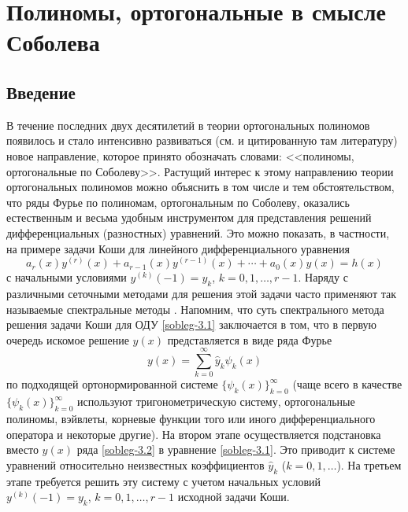 \chapter{Полиномы, ортогональные в смысле Соболева}
\section{Введение}\label{common-sob-intro}
В течение последних двух десятилетий в теории ортогональных полиномов появилось и стало
интенсивно развиваться (см. \cite{sobleg-KwonLittl1, sobleg-KwonLittl2, sobleg-MarcelAlfaroRezola, sobleg-IserKoch, sobleg-Meijer, sobleg-Lopez1995, sobleg-MarcelXu, sobleg-Shar2016} и цитированную там литературу) новое направление, которое принято обозначать словами: <<полиномы, ортогональные по Соболеву>>. Растущий интерес  к этому направлению теории ортогональных полиномов можно объяснить в том числе и тем обстоятельством, что ряды Фурье по полиномам, ортогональным по Соболеву, оказались естественным и весьма удобным инструментом для представления решений  дифференциальных (разностных) уравнений. Это можно показать, в частности, на примере  задачи Коши для линейного дифференциального уравнения
\begin{equation}\label{sobleg-3.1}
 a_r(x)y^{(r)}(x)+a_{r-1}(x)y^{(r-1)}(x)+\cdots+a_0(x)y(x)=h(x)
 \end{equation}
с начальными условиями $y^{(k)}(-1)=y_k$, $k=0,1,\ldots,r-1$.  Наряду с различными сеточными методами для решения этой задачи часто применяют так называемые спектральные методы \cite{sobleg-Tref1, sobleg-Tref2, sobleg-SolDmEg, sobleg-Pash, sobleg-MMG2016}. Напомним, что суть спектрального метода решения задачи Коши  для ОДУ \eqref{sobleg-3.1} заключается в том, что в первую очередь искомое решение $y(x)$ представляется в виде ряда Фурье
\begin{equation}\label{sobleg-3.2}
 y(x)=\sum_{k=0}^\infty \hat y_k\psi_k(x)
 \end{equation}
по подходящей ортонормированной системе $\{\psi_k(x)\}_{k=0}^\infty$ (чаще всего в качестве $\{\psi_k(x)\}_{k=0}^\infty$ используют    тригонометрическую систему, ортогональные полиномы, вэйвлеты, корневые функции того или иного дифференциального оператора  и некоторые другие). На втором этапе осуществляется подстановка вместо $y(x)$ ряда \eqref{sobleg-3.2} в уравнение \eqref{sobleg-3.1}. Это приводит к системе уравнений относительно неизвестных коэффициентов $\hat y_k$ ($k=0,1,\ldots$). На третьем этапе требуется решить эту систему с учетом начальных условий  $y^{(
k)}(-1)=y_k$, $k=0,1,\ldots,r-1$ исходной задачи Коши.

